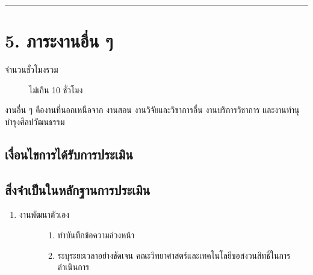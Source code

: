\documentclass[a4paper,12pt,english]{sphinxmanual}
\begin{document}
\bigskip\hrule\bigskip



\chapter{5. ภาระงานอื่น ๆ}
\label{\detokenize{5etc:id1}}\label{\detokenize{5etc::doc}}\begin{description}
\item[{จำนวนชั่วโมงรวม}] \leavevmode
ไม่เกิน 10 ชั่วโมง

\end{description}

งานอื่น ๆ คืองานที่นอกเหนือจาก งานสอน งานวิจัยและวิชาการอื่น งานบริการวิชาการ และงานทำนุบำรุงศิลปวัฒนธรรม


\section{เงื่อนไขการได้รับการประเมิน}
\label{\detokenize{5etc:id2}}

\section{สิ่งจำเป็นในหลักฐานการประเมิน}
\label{\detokenize{5etc:id3}}\begin{enumerate}
%
\item {} \begin{description}
\item[{งานพัฒนาตัวเอง}] \leavevmode\begin{enumerate}
%
\item {} 
 ทำบันทึกข้อความล่วงหน้า

\item {} 
 ระบุระยะเวลาอย่างชัดเจน คณะวิทยาศาสตร์และเทคโนโลยีขอสงวนสิทธิ์ในการดำเนินการ

\end{enumerate}

\end{description}

\end{enumerate}
\end{document}
